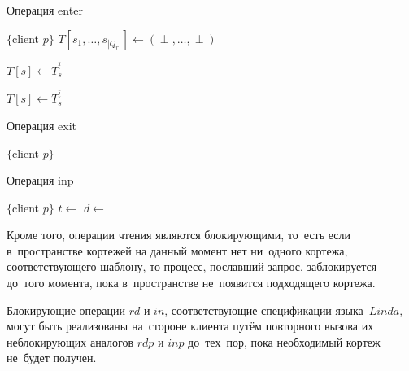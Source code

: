 \begin{algorithm}[H]
	\caption{Операция enter}\label{alg5}
	\begin{algorithmic}[1]
		\Statex $\{$client $p \}$
		\State $T[s_1, \dots, s_{|Q_r|}] \gets (\perp, \dots, \perp)$
		
		\State {}
		\State $T[s] \gets T_s^{\bar t}$
		\EndFor
		
		\State {}
		\State $T[s] \gets T_s^{\bar t}$
		\EndFor
		
		\State {}
		\EndIf
		\State \Return{$\perp$}
		\EndFunction
	\end{algorithmic}
\end{algorithm}

\begin{algorithm}[H]
	\caption{Операция exit}\label{alg6}
	\begin{algorithmic}[1]
		\Statex $\{$client $p \}$
		\State {}
		\EndFor
		\EndProcedure
	\end{algorithmic}
\end{algorithm}

\begin{algorithm}[H]
	\caption{Операция inp}\label{alg9}
	\begin{algorithmic}[1]
		\Statex $\{$client $p \}$
		\Repeat
		\State $t \gets$ 
		\State {}
		\State \Return{$\perp$}
		\EndIf
		\State $d \gets$ 
		\State {}
		\State {}
		\EndFunction
	\end{algorithmic}
	\end{algorithm}

Кроме того, операции чтения являются блокирующими, то~есть если в~пространстве кортежей на данный момент нет ни~одного кортежа, соответствующего шаблону, то процесс, пославший запрос, заблокируется до~того момента, пока в~пространстве не~появится подходящего кортежа.

Блокирующие операции $rd$ и $in$, соответствующие спецификации языка~$Linda$, могут быть реализованы на~стороне клиента путём повторного вызова их неблокирующих аналогов $rdp$ и $inp$ до~тех~пор, пока необходимый кортеж не~будет получен.

